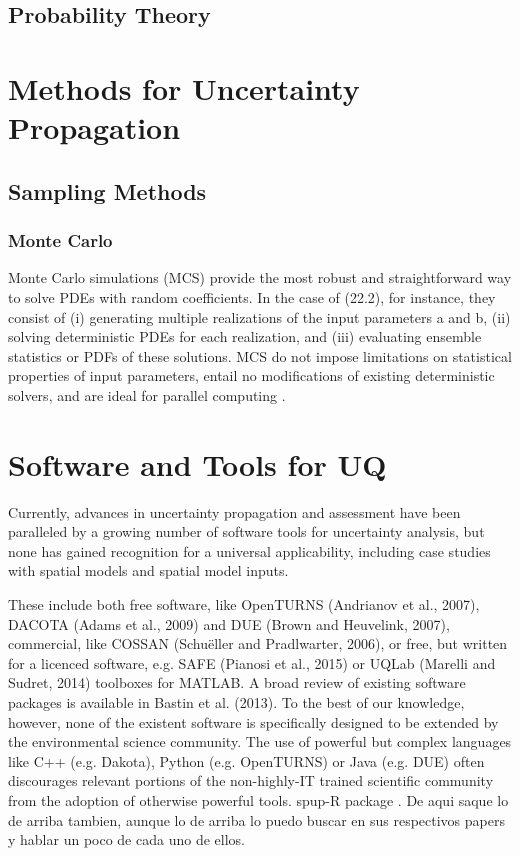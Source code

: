 \subsection{Probability Theory}

\section{Methods for Uncertainty Propagation}

\subsection{Sampling Methods}

\subsubsection{Monte Carlo}
Monte Carlo simulations (MCS) provide the most robust and straightforward way to
solve PDEs with random coefficients. In the case of (22.2), for instance, they consist
of (i) generating multiple realizations of the input parameters a and b, (ii) solving
deterministic PDEs for each realization, and (iii) evaluating ensemble statistics or
PDFs of these solutions. MCS do not impose limitations on statistical properties of
input parameters, entail no modifications of existing deterministic solvers, and are
ideal for parallel computing \cite{Higdon2017}.

\section{Software and Tools for UQ}
Currently, advances in uncertainty propagation and assessment have been paralleled by a growing number of software tools for uncertainty analysis, but none has gained recognition for a universal applicability, including case studies with spatial models and spatial model inputs. \cite{Sawicka2016}

These include both free software, like OpenTURNS (Andrianov et al., 2007), DACOTA (Adams et al., 2009) and DUE (Brown and Heuvelink, 2007), commercial, like COSSAN (Schuëller and Pradlwarter, 2006), or free, but written for a licenced software, e.g. SAFE (Pianosi et al., 2015) or UQLab (Marelli and Sudret, 2014) toolboxes for MATLAB. A broad review of existing software packages is available in Bastin et al. (2013). To the best of our knowledge, however, none of the existent software is specifically designed to be extended by the environmental science community. The use of powerful but complex languages like C++ (e.g. Dakota), Python (e.g. OpenTURNS) or Java (e.g. DUE) often discourages relevant portions of the non-highly-IT trained scientific community from the adoption of otherwise powerful tools.
spup-R package \cite{Sawicka2016}. De aqui saque lo de arriba tambien, aunque lo de arriba lo puedo buscar en sus respectivos papers y hablar un poco de cada uno de ellos.

